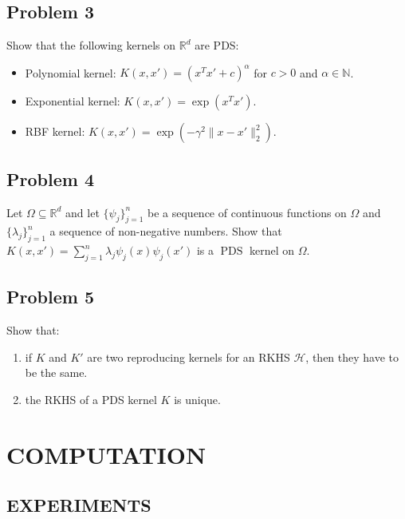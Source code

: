 \documentclass[12pt]{article}
\begin{document}
\subsection*{Problem 3} %
\begin{mdframed}
    Show that the following kernels on $\mathbb{R}^{d}$ are PDS:
    \begin{itemize}
        \item Polynomial kernel: $K(x, x')=(x^{T} x'+c)^{\alpha}$ for $c>0$ and $\alpha \in \mathbb{N}$.
        \item Exponential kernel: $K(x, x')=\exp (x^Tx')$.
        \item RBF kernel: $K(x, x')=\exp (-\gamma^{2}\|x-x'\|_2^2)$.
    \end{itemize}
\end{mdframed}


\subsection*{Problem 4} %
\begin{mdframed}
    Let $\Omega \subseteq \mathbb{R}^{d}$ and let $\{\psi_j\}_{j=1}^n$ be a sequence of continuous 
    functions on $\Omega$ and $\{\lambda_j\}_{j=1}^n$ a sequence of non-negative numbers. Show that 
    $K(x,x')=\sum_{j=1}^n \lambda_j\psi_j(x)\psi_j(x')$ is a $\operatorname{PDS}$ kernel on $\Omega$.
\end{mdframed}



\subsection*{Problem 5} %
\begin{mdframed}
    Show that:
    \begin{enumerate}[topsep=0pt, partopsep=0pt, itemsep=0pt, label=(\roman*)]
        \item if $K$ and $K'$ are two reproducing kernels for an RKHS $\mathcal{H}$, 
            then they have to be the same. \\
        \item the RKHS of a PDS kernel $K$ is unique.
    \end{enumerate}
\end{mdframed}





\section*{COMPUTATION}

\subsection*{EXPERIMENTS}
\end{document}
